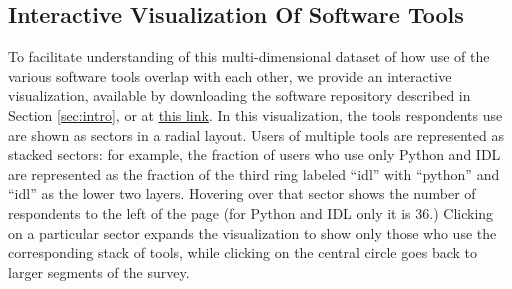 \subsection{Interactive Visualization Of Software Tools}
\label{ssec:d3viz}

To facilitate understanding of this multi-dimensional dataset of how use of the various software tools overlap with each other, we provide an interactive visualization, available by downloading the software repository described in Section \ref{sec:intro}, or at \href{http://eteq.github.io/software_survey_analysis/software_tools_heirarchy_d3vis.html}{this link}. In this visualization, the tools respondents use are shown as sectors in a radial layout.  Users of multiple tools are represented as stacked sectors: for example, the fraction of users who use only Python and IDL are represented as the fraction of the third ring labeled ``idl'' with ``python'' and ``idl'' as the lower two layers.  Hovering over that sector shows the number of respondents to the left of the page (for Python and IDL only it is 36.)  Clicking on a particular sector expands the visualization to show only those who use the corresponding stack of tools, while clicking on the central circle goes back to larger segments of the survey.